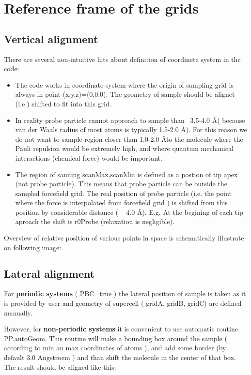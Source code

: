 \section{Reference frame of the grids}

\subsection{Vertical alignment}

There are several non-intuitive hits about definition of coordinete system in
the code:


\begin{itemize}
    \item The code works in coordinate system where the origin of sampling grid
    is always in point (x,y,z)=(0,0,0). The geometry of sample should be alignet
    (i.e.) shifted to fit into this grid.

    \item In reality probe particle cannot approach to sample than ~3.5-4.0
    \AA ( because van der Waals radius of most atoms is typically 1.5-2.0
    \AA ). For this reason we do not want to sample region closer than
    1.0-2.0 \AA to the molecule where the Pauli repulsion would be
    extremely high, and where quantum mechanical interactions (chemical force)
    would be important.

    \item The region of sanning scanMax,scanMin is defined as a postion of tip
    apex (not probe particle). This means that probe particle can be outside the
    sampled forcefield grid. The real position of probe particle (i.e. the point
    where the force is interpolated from forcefield grid ) is shifted from this
    position by considerable distance ( ~ 4.0 \AA ). E.g. At the begining
    of each tip aproach the shift is r0Probe (relaxation is negligible).


\end{itemize}



Overview of relative position of various points in space is schematically
illustrate on following image:




\subsection{Lateral alignment}
For \textbf{ periodic systems} ( PBC=true ) the lateral position of sample is taken as it
is provided by user and geometry of supercell ( gridA, gridB, gridC) are defined
manually.

However, for \textbf{ non-periodic systems } it is convenient to use automatic routine
PP.autoGeom. This routine will make a bounding box around the sample ( according
to min an max coordinates of atoms ), and add some border (by default 3.0
Angstroem ) and than shift the molecule in the center of that box. The result
should be aligned like this:
